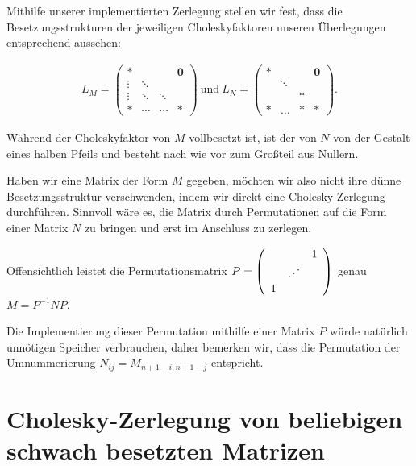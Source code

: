 Mithilfe unserer implementierten Zerlegung stellen wir fest, dass die Besetzungsstrukturen der jeweiligen Choleskyfaktoren unseren Überlegungen entsprechend aussehen:

\begin{align*}
    L_{M} =
\left(\begin{array}{cccccc}
                \ast &&&\boldsymbol{0} \\
                \vdots & \ddots && \\
                \vdots & \ddots & \ddots & \\
                \ast &\cdots &\cdots & \ast
      \end{array}
\right)
\mathrm{~und~}
    L_{N} =
\left(\begin{array}{cccccc}
                \ast &&& \boldsymbol{0} \\
                & \ddots && \\
                && \ast & \\
                \ast & \hdots & \ast & \ast
      \end{array}
\right).
\end{align*}

Während der Choleskyfaktor von $M$ vollbesetzt ist, ist der von $N$ von der Gestalt eines halben Pfeils und besteht nach wie vor zum Großteil aus Nullern.

Haben wir eine Matrix der Form $M$ gegeben, möchten wir also nicht ihre dünne Besetzungsstruktur verschwenden, indem wir direkt eine Cholesky-Zerlegung durchführen. Sinnvoll wäre es, die Matrix durch Permutationen auf die Form einer Matrix $N$ zu bringen und erst im Anschluss zu zerlegen.

Offensichtlich leistet die Permutationsmatrix $P =
\left(\begin{array}{cccccc}
                &&1 \\
                & \reflectbox{$\ddots$}& \\
                1  &  &
      \end{array}
\right) $ genau
$M=P^{-1}NP$.

Die Implementierung dieser Permutation mithilfe einer Matrix $P$ würde natürlich unnötigen Speicher verbrauchen, daher bemerken wir, dass die Permutation der Umnummerierung $N_{ij} = M_{n+1-i,n+1-j}$ entspricht.

\section{Cholesky-Zerlegung von beliebigen schwach besetzten Matrizen}

